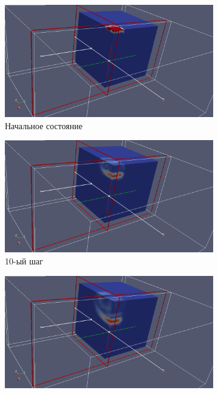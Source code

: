 \begin{figure}[H]
\begin{subfigure}[b]{0.5\textwidth}
\centering
\includegraphics[width=1.0\textwidth]{png/two-graphite-layers/2clip0.png}
\caption{Начальное состояние}
\end{subfigure}
\begin{subfigure}[b]{0.5\textwidth}
\centering
\includegraphics[width=1.0\textwidth]{png/two-graphite-layers/2clip10.png}
\caption{10-ый шаг}
\end{subfigure}
\begin{subfigure}[b]{0.5\textwidth}
\centering
\includegraphics[width=1.0\textwidth]{png/two-graphite-layers/2clip20.png}

\end{subfigure}
\end{figure}
